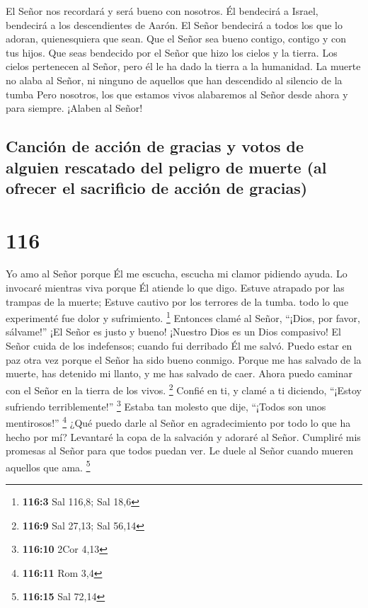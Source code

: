  El Señor nos recordará y será bueno con nosotros. Él
bendecirá a Israel, bendecirá a los descendientes de Aarón.
 El Señor bendecirá a todos los que lo adoran,
quienesquiera que sean.  Que el Señor sea bueno contigo,
contigo y con tus hijos.  Que seas bendecido por el Señor
que hizo los cielos y la tierra.  Los cielos pertenecen al
Señor, pero él le ha dado la tierra a la humanidad.  La
muerte no alaba al Señor, ni ninguno de aquellos que han descendido al
silencio de la tumba  Pero nosotros, los que estamos vivos
alabaremos al Señor desde ahora y para siempre. ¡Alaben al Señor!

\hypertarget{canciuxf3n-de-acciuxf3n-de-gracias-y-votos-de-alguien-rescatado-del-peligro-de-muerte-al-ofrecer-el-sacrificio-de-acciuxf3n-de-gracias}{%
\subsection{Canción de acción de gracias y votos de alguien rescatado
del peligro de muerte (al ofrecer el sacrificio de acción de
gracias)}\label{canciuxf3n-de-acciuxf3n-de-gracias-y-votos-de-alguien-rescatado-del-peligro-de-muerte-al-ofrecer-el-sacrificio-de-acciuxf3n-de-gracias}}

\hypertarget{section-115}{%
\section{116}\label{section-115}}

 Yo amo al Señor porque Él me escucha, escucha mi clamor
pidiendo ayuda.  Lo invocaré mientras viva porque Él atiende
lo que digo.  Estuve atrapado por las trampas de la muerte;
Estuve cautivo por los terrores de la tumba. todo lo que experimenté fue
dolor y sufrimiento. \footnote{\textbf{116:3} Sal 116,8; Sal 18,6}
 Entonces clamé al Señor, ``¡Dios, por favor, sálvame!''
 ¡El Señor es justo y bueno! ¡Nuestro Dios es un Dios
compasivo!  El Señor cuida de los indefensos; cuando fui
derribado Él me salvó.  Puedo estar en paz otra vez porque
el Señor ha sido bueno conmigo.  Porque me has salvado de la
muerte, has detenido mi llanto, y me has salvado de caer. 
Ahora puedo caminar con el Señor en la tierra de los vivos. \footnote{\textbf{116:9}
  Sal 27,13; Sal 56,14}  Confié en ti, y clamé a ti
diciendo, ``¡Estoy sufriendo terriblemente!'' \footnote{\textbf{116:10}
  2Cor 4,13}  Estaba tan molesto que dije, ``¡Todos son
unos mentirosos!'' \footnote{\textbf{116:11} Rom 3,4}  ¿Qué
puedo darle al Señor en agradecimiento por todo lo que ha hecho por mí?
 Levantaré la copa de la salvación y adoraré al Señor.
 Cumpliré mis promesas al Señor para que todos puedan ver.
 Le duele al Señor cuando mueren aquellos que ama.
\footnote{\textbf{116:15} Sal 72,14}

